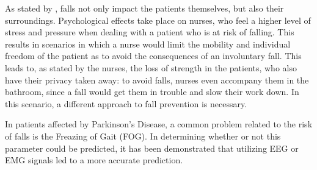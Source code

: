 






As stated by \cite{ImpactFallNurses}, falls not only impact the patients themselves, but also their surroundings. Psychological effects take place on nurses, who feel a higher level of stress and pressure when dealing with a patient who is at risk of falling. This results in scenarios in which a nurse would limit the mobility and individual freedom of the patient as to avoid the consequences of an involuntary fall. This leads to, as stated by the nurses, the loss of strength in the patients, who also have their privacy taken away: to avoid falls, nurses even accompany them in the bathroom, since a fall would get them in trouble and slow their work down. 
In this scenario, a different approach to fall prevention is necessary.



In patients affected by Parkinson's Disease, a common problem related to the risk of falls is the Freazing of Gait (FOG). In determining whether or not this parameter could be predicted, it has been demonstrated that utilizing EEG or EMG signals led to a more accurate prediction. 
